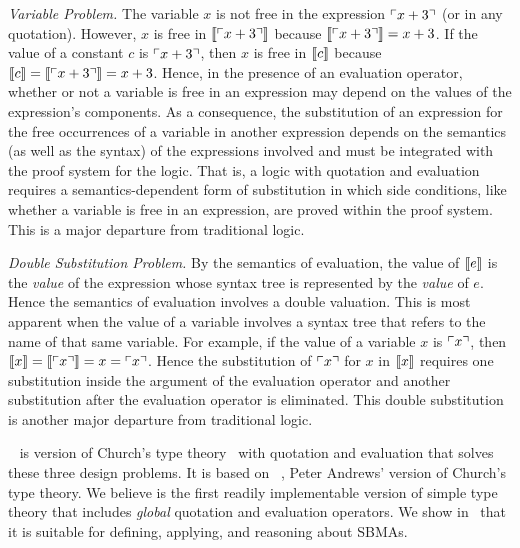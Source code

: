 \documentclass[fleqn]{llncs}
\begin{document}
  \item \emph{Variable Problem.}  The variable $x$ is not free in the
    expression $\ulcorner x + 3\urcorner$ (or in any quotation).  However, $x$
    is free in $\llbracket\ulcorner x + 3\urcorner\rrbracket$ because
    $\llbracket\ulcorner x + 3\urcorner\rrbracket = x + 3$.  If the value of a constant
    $c$ is $\ulcorner x + 3\urcorner$, then $x$ is free in $\llbracket c\rrbracket$
    because $\llbracket c\rrbracket = \llbracket\ulcorner x + 3\urcorner\rrbracket = x + 3$.
    Hence, in the presence of an evaluation operator, whether or not a
    variable is free in an expression may depend on the values of the
    expression's components.  As a consequence, the substitution of an
    expression for the free occurrences of a variable in another
    expression depends on the semantics (as well as the syntax) of the
    expressions involved and must be integrated with the proof system
    for the logic.  That is, a logic with quotation and evaluation
    requires a semantics-dependent form of substitution in which side
    conditions, like whether a variable is free in an expression, are
    proved within the proof system.  This is a major departure from
    traditional logic.

  \item \emph{Double Substitution Problem.}  By the semantics of
    evaluation, the value of $\llbracket e\rrbracket$ is the \emph{value} of the
    expression whose syntax tree is represented by the \emph{value} of
    $e$.  Hence the semantics of evaluation involves a double
    valuation.  This is most apparent when the value of a variable
    involves a syntax tree that refers to the name of that same
    variable. For example, if the value of a variable $x$ is
    $\ulcorner x\urcorner$, then $\llbracket x\rrbracket = \llbracket\ulcorner x\urcorner\rrbracket = x =
    \ulcorner x\urcorner$.  Hence the substitution of $\ulcorner x\urcorner$ for $x$
    in $\llbracket x\rrbracket$ requires one substitution inside the argument of
    the evaluation operator and another substitution after the
    evaluation operator is eliminated.  This double substitution is
    another major departure from traditional logic.

\ee

{\churchqe}~\cite{Farmer16,Farmer18} is version of Church's type
theory~\cite{Church40} with quotation and evaluation that solves these
three design problems.  It is based on {\qzero}~\cite{Andrews02},
Peter Andrews' version of Church's type theory.  We believe
{\churchqe} is the first readily implementable version of simple type
theory that includes \emph{global} quotation and evaluation operators.  We
show in~\cite{Farmer18} that it is suitable for defining,
applying, and reasoning about SBMAs.
\end{document}
